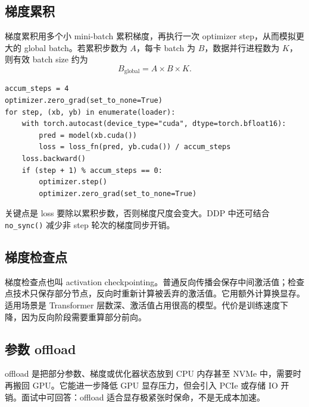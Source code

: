 \subsection{梯度累积}
梯度累积用多个小 mini-batch 累积梯度，再执行一次 optimizer step，从而模拟更大的 global batch。若累积步数为 $A$，每卡 batch 为 $B$，数据并行进程数为 $K$，则有效 batch size 约为
\[
  B_{\mathrm{global}} = A \times B \times K .
\]
\begin{lstlisting}
accum_steps = 4
optimizer.zero_grad(set_to_none=True)
for step, (xb, yb) in enumerate(loader):
    with torch.autocast(device_type="cuda", dtype=torch.bfloat16):
        pred = model(xb.cuda())
        loss = loss_fn(pred, yb.cuda()) / accum_steps
    loss.backward()
    if (step + 1) % accum_steps == 0:
        optimizer.step()
        optimizer.zero_grad(set_to_none=True)
\end{lstlisting}
关键点是 loss 要除以累积步数，否则梯度尺度会变大。DDP 中还可结合 \texttt{no\_sync()} 减少非 step 轮次的梯度同步开销。
\subsection{梯度检查点}
梯度检查点也叫 activation checkpointing。普通反向传播会保存中间激活值；检查点技术只保存部分节点，反向时重新计算被丢弃的激活值。它用额外计算换显存。
适用场景是 Transformer 层数深、激活值占用很高的模型。代价是训练速度下降，因为反向阶段需要重算部分前向。
\subsection{参数 offload}
offload 是把部分参数、梯度或优化器状态放到 CPU 内存甚至 NVMe 中，需要时再搬回 GPU。它能进一步降低 GPU 显存压力，但会引入 PCIe 或存储 IO 开销。面试中可回答：offload 适合显存极紧张时保命，不是无成本加速。
